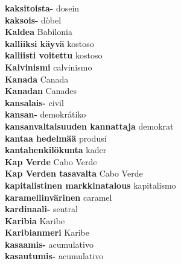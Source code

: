 \textbf{ kaksitoista-  } dosein \\
\textbf{ kaksois-  } dòbel \\
\textbf{ Kaldea  } Babilonia \\
\textbf{ kalliiksi käyvä  } kostoso \\
\textbf{ kalliisti voitettu  } kostoso \\
\textbf{ Kalvinismi  } calvinismo \\
\textbf{ Kanada  } Canada \\
\textbf{ Kanadan  } Canades \\
\textbf{ kansalais-  } civil \\
\textbf{ kansan-  } demokrátiko \\
\textbf{ kansanvaltaisuuden kannattaja  } demokrat \\
\textbf{ kantaa hedelmää  } produsí \\
\textbf{ kantahenkilökunta  } kader \\
\textbf{ Kap Verde  } Cabo Verde \\
\textbf{ Kap Verden tasavalta  } Cabo Verde \\
\textbf{ kapitalistinen markkinatalous  } kapitalismo \\
\textbf{ karamellinvärinen  } caramel \\
\textbf{ kardinaali-  } sentral \\
\textbf{ Karibia  } Karibe \\
\textbf{ Karibianmeri  } Karibe \\
\textbf{ kasaamis-  } acumulativo \\
\textbf{ kasautumis-  } acumulativo \\
